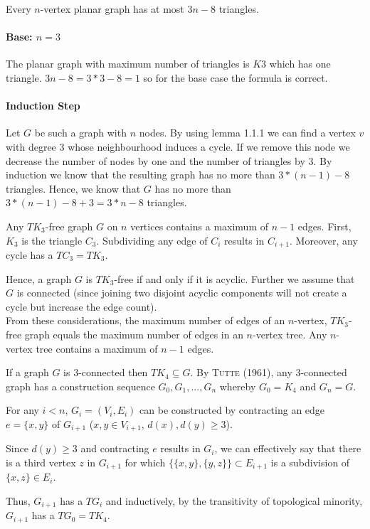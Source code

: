 \documentclass[a4paper]{article}
\begin{document}
\begin{solution}{21}
\begin{theorem}{Every $n$-vertex planar graph has at most $3n-8$ triangles.}
		\paragraph{Base: $n=3$}
		The planar graph with maximum number of triangles is $K3$ which has one triangle. 
		$3n-8 = 3*3-8 = 1$ so for the base case the formula is correct.  
		\paragraph{Induction Step}
		Let $G$ be such a graph with $n$ nodes. 
		By using lemma 1.1.1 we can find a vertex $v$ with degree 3 whose neighbourhood induces a cycle.
		If we remove this node we decrease the number of nodes by one and the number of triangles by 3. 
		By induction we know that the resulting graph has no more than $3*(n-1) -8$ triangles. 
		Hence, we know that $G$ has no more than $3*(n-1) -8 + 3 = 3*n-8$ triangles. 
		\end{theorem}
	\end{solution}
	\newpage
	\begin{solution}{22}
		\begin{theorem}{Any $TK_3$-free graph $G$ on $n$ vertices contains a maximum of $n-1$ edges.}
			First, $K_3$ is the triangle $C_3$. Subdividing any edge of $C_i$ results in $C_{i+1}$. Moreover, any cycle has a $TC_3 = TK_3$.
			
			Hence, a graph $G$ is $TK_3$-free if and only if it is acyclic. Further we assume that $G$ is connected (since joining two disjoint acyclic components will not create a cycle but increase the edge count).\\

			From these considerations, the maximum number of edges of an $n$-vertex, $TK_3$-free graph equals the maximum number of edges in an $n$-vertex tree. Any $n$-vertex tree contains a maximum of $n - 1$ edges.
		\end{theorem}

		\begin{theorem}{If a graph $G$ is $3$-connected then $TK_4 \subseteq G$.}
			By \textsc{Tutte (1961)}, any $3$-connected graph has a construction sequence $G_0, G_1, ..., G_n$ whereby $G_0 = K_4$ and $G_n = G$.

			For any $i < n$, $G_i = (V_i, E_i)$ can be constructed by contracting an edge $e = \{x, y\}$ of $G_{i+1}$ ($x, y \in V_{i+1}$, $d(x), d(y) \geq 3$).

			Since $d(y) \geq 3$ and contracting $e$ results in $G_i$, we can effectively say that there is a third vertex $z$ in $G_{i+1}$ for which $\{\{x,y\}, \{y, z\}\} \subset E_{i+1}$ is a subdivision of $\{x,z\} \in E_i$.

			Thus, $G_{i+1}$ has a $TG_{i}$ and inductively, by the transitivity of topological minority, $G_{i+1}$ has a $TG_0 = TK_4$.
		\end{theorem}
	\end{solution}
	
\end{document}
